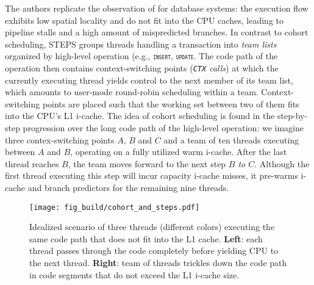 \documentclass[12pt,a4paper]{book}
\begin{document}
The authors replicate the observation of \cite{cohort} for database systems: the execution flow exhibits low spatial locality and do not fit into the CPU caches, leading to pipeline stalls and a high amount of mispredicted branches.
In contrast to cohort scheduling, STEPS groups threads handling a transaction into \emph{team lists} organized by high-level operation (e.g., \texttt{\textsc{insert}}, \texttt{\textsc{update}}.
The code path of the operation then contains context-switching points (\textit{\texttt{CTX} calls}) at which the currently executing thread yields control to the next member of its team list, which amounts to user-mode round-robin scheduling within a team.
Context-switching points are placed such that the working set between two of them fits into the CPU's L1 i-cache.
The idea of cohort scheduling is found in the step-by-step progression over the long code path of the high-level operation:
we imagine three contex-switching points $A$, $B$ and $C$ and a team of ten threads executing between $A$ and $B$, operating on a fully utilized warm i-cache.
After the last thread reaches $B$, the team moves forward to the next step  \textit{$B$ to $C$}.
Although the first thread executing this step will incur capacity i-cache misses, it pre-warms i-cache and branch predictors for the remaining nine threads.~\cite{steps}

\begin{figure}[h]
    \centering
    \texttt{[image: fig\_build/cohort\_and\_steps.pdf]}
    \caption{
        Idealized scenario of three threads (different colors) executing the same code path that does not fit into the L1 cache.
        \textbf{Left}: each thread passes through the code completely before yielding CPU to the next thread.
        \textbf{Right}: team of threads trickles down the code path in code segments that do not exceed the L1 i-cache size.
    }
    \label{fig:cohort_and_steps}
\end{figure}
\end{document}
